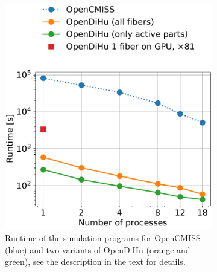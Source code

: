 \begin{figure}[H]
  \centering%
  \begin{subfigure}[t]{0.49\textwidth}%
    \centering%
    \includegraphics[width=\textwidth]{images/results/studies/0_strong_scaling_runtime.pdf}%
    \caption{Runtime of the simulation programs for OpenCMISS (blue) and two variants of OpenDiHu (orange and green), see the description in the text for details. 
    }%
    \label{fig:0_strong_scaling_runtime}%
  \end{subfigure}
  \quad
  \begin{subfigure}[t]{0.47\textwidth}%
    \centering%

\end{subfigure}
\end{figure}
